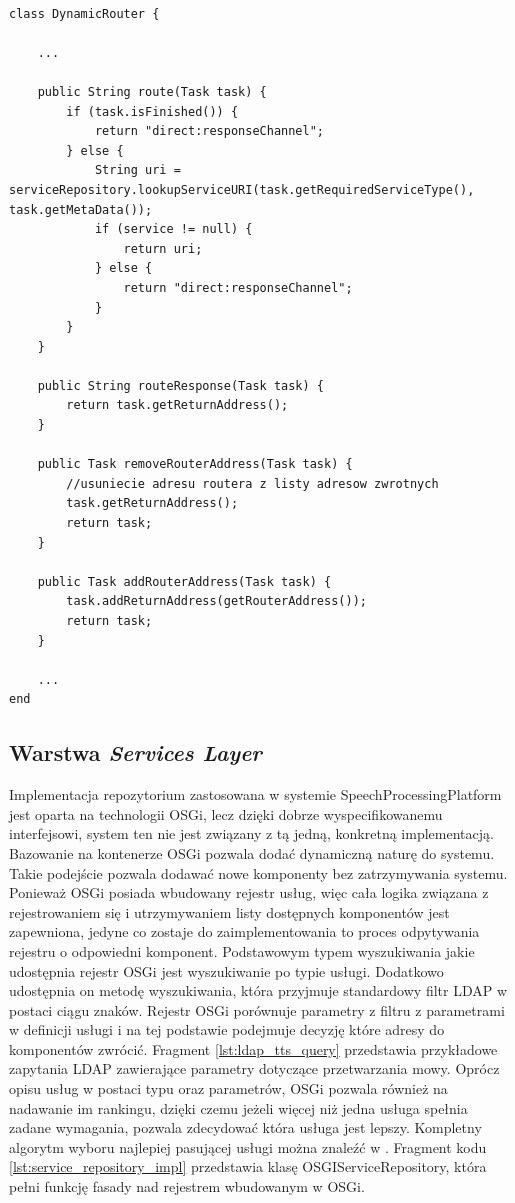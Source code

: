 \begin{center}
\begin{lstlisting}

class DynamicRouter {

	...

	public String route(Task task) {
		if (task.isFinished()) {
			return "direct:responseChannel";
		} else {
			String uri = serviceRepository.lookupServiceURI(task.getRequiredServiceType(), task.getMetaData());
			if (service != null) {
				return uri;
			} else {
				return "direct:responseChannel";
			}
		}
	}

	public String routeResponse(Task task) {
		return task.getReturnAddress();
	}

	public Task removeRouterAddress(Task task) {
		//usuniecie adresu routera z listy adresow zwrotnych
		task.getReturnAddress();
		return task;
	}

	public Task addRouterAddress(Task task) {
		task.addReturnAddress(getRouterAddress());
		return task;
	}

	...
end
\end{lstlisting}
\end{center}

\subsection{Warstwa \textit{Services Layer}}

Implementacja repozytorium zastosowana w systemie SpeechProcessingPlatform jest oparta na technologii OSGi, lecz dzięki dobrze wyspecifikowanemu interfejsowi, system ten nie jest związany z tą jedną, konkretną implementacją. Bazowanie na kontenerze OSGi pozwala dodać dynamiczną naturę do systemu. Takie podejście pozwala dodawać nowe komponenty bez zatrzymywania systemu. Ponieważ OSGi posiada wbudowany rejestr usług, więc cała logika związana z rejestrowaniem się i utrzymywaniem listy dostępnych komponentów jest zapewniona, jedyne co zostaje do zaimplementowania to proces odpytywania rejestru o odpowiedni komponent. Podstawowym typem wyszukiwania jakie udostępnia rejestr OSGi jest wyszukiwanie po typie usługi. Dodatkowo udostępnia on metodę wyszukiwania, która przyjmuje standardowy filtr LDAP \cite{ldaprfc1996} w postaci ciągu znaków. Rejestr OSGi porównuje parametry z filtru z parametrami w definicji usługi i na tej podstawie podejmuje decyzję które adresy do komponentów zwrócić. Fragment \ref{lst:ldap_tts_query} przedstawia przykładowe zapytania LDAP zawierające parametry dotyczące przetwarzania mowy. Oprócz opisu usług w postaci typu oraz parametrów, OSGi pozwala również na nadawanie im rankingu, dzięki czemu jeżeli więcej niż jedna usługa spełnia zadane wymagania, pozwala zdecydować która usługa jest lepszy. Kompletny algorytm wyboru najlepiej pasującej usługi można znaleźć w \cite{hall2011}. Fragment kodu \ref{lst:service_repository_impl} przedstawia klasę OSGIServiceRepository, która pełni funkcję fasady nad rejestrem wbudowanym w OSGi.

